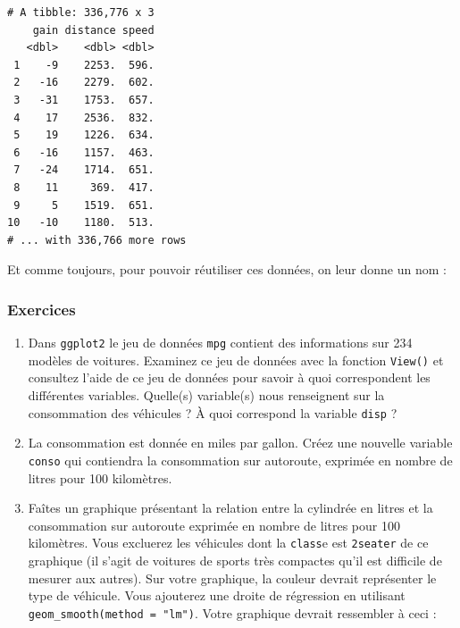 \documentclass[a4paperpaper,]{article}
\newenvironment{Shaded}{\begin{snugshade}}{\end{snugshade}}
\newcommand{\DataTypeTok}[1]{\textcolor[rgb]{0.00,0.34,0.68}{#1}}
\newcommand{\DecValTok}[1]{\textcolor[rgb]{0.69,0.50,0.00}{#1}}
\newcommand{\FloatTok}[1]{\textcolor[rgb]{0.69,0.50,0.00}{#1}}
\newcommand{\KeywordTok}[1]{\textcolor[rgb]{0.12,0.11,0.11}{\textbf{#1}}}
\newcommand{\NormalTok}[1]{\textcolor[rgb]{0.12,0.11,0.11}{#1}}
\newcommand{\OperatorTok}[1]{\textcolor[rgb]{0.12,0.11,0.11}{#1}}
\newcommand{\StringTok}[1]{\textcolor[rgb]{0.75,0.01,0.01}{#1}}
\begin{document}
\begin{verbatim}
# A tibble: 336,776 x 3
    gain distance speed
   <dbl>    <dbl> <dbl>
 1    -9    2253.  596.
 2   -16    2279.  602.
 3   -31    1753.  657.
 4    17    2536.  832.
 5    19    1226.  634.
 6   -16    1157.  463.
 7   -24    1714.  651.
 8    11     369.  417.
 9     5    1519.  651.
10   -10    1180.  513.
# ... with 336,766 more rows
\end{verbatim}

Et comme toujours, pour pouvoir réutiliser ces données, on leur donne un nom :

\begin{Shaded}
\end{Shaded}

\hypertarget{exercices-10}{%
\subsubsection{Exercices}\label{exercices-10}}

\begin{enumerate}
\def\labelenumi{\arabic{enumi}.}
\item
  Dans \texttt{ggplot2} le jeu de données \texttt{mpg} contient des informations sur 234 modèles de voitures. Examinez ce jeu de données avec la fonction \texttt{View()} et consultez l'aide de ce jeu de données pour savoir à quoi correspondent les différentes variables. Quelle(s) variable(s) nous renseignent sur la consommation des véhicules ? À quoi correspond la variable \texttt{disp} ?
\item
  La consommation est donnée en miles par gallon. Créez une nouvelle variable \texttt{conso} qui contiendra la consommation sur autoroute, exprimée en nombre de litres pour 100 kilomètres.
\item
  Faîtes un graphique présentant la relation entre la cylindrée en litres et la consommation sur autoroute exprimée en nombre de litres pour 100 kilomètres. Vous excluerez les véhicules dont la \texttt{class}e est \texttt{2seater} de ce graphique (il s'agit de voitures de sports très compactes qu'il est difficile de mesurer aux autres). Sur votre graphique, la couleur devrait représenter le type de véhicule. Vous ajouterez une droite de régression en utilisant \texttt{geom\_smooth(method\ =\ "lm")}. Votre graphique devrait ressembler à ceci :
\end{enumerate}
\end{document}
